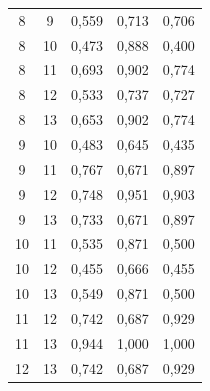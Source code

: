 \documentclass[12pt,a4paper,oneside]{report}
\begin{document}
\begin{longtable}{ccccc}
8 & 9 & 0,559 & 0,713 & 0,706 \\
8 & 10 & 0,473 & 0,888 & 0,400 \\
8 & 11 & 0,693 & 0,902 & 0,774 \\
8 & 12 & 0,533 & 0,737 & 0,727 \\
8 & 13 & 0,653 & 0,902 & 0,774 \\
9 & 10 & 0,483 & 0,645 & 0,435 \\
9 & 11 & 0,767 & 0,671 & 0,897 \\
9 & 12 & 0,748 & 0,951 & 0,903 \\
9 & 13 & 0,733 & 0,671 & 0,897 \\
10 & 11 & 0,535 & 0,871 & 0,500 \\
10 & 12 & 0,455 & 0,666 & 0,455 \\
10 & 13 & 0,549 & 0,871 & 0,500 \\
11 & 12 & 0,742 & 0,687 & 0,929 \\
11 & 13 & 0,944 & 1,000 & 1,000 \\
12 & 13 & 0,742 & 0,687 & 0,929 \\
\end{longtable}
\endgroup
\end{document}
